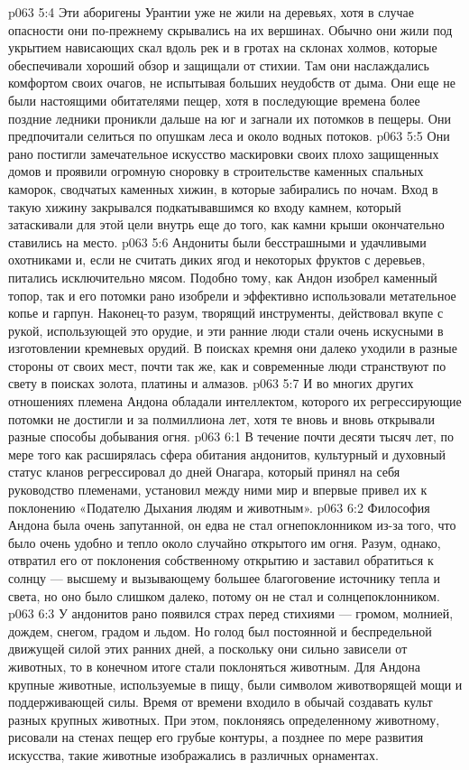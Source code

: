 \vs p063 5:4 Эти аборигены Урантии уже не жили на деревьях, хотя в случае опасности они по\hyp{}прежнему скрывались на их вершинах. Обычно они жили под укрытием нависающих скал вдоль рек и в гротах на склонах холмов, которые обеспечивали хороший обзор и защищали от стихии. Там они наслаждались комфортом своих очагов, не испытывая больших неудобств от дыма. Они еще не были настоящими обитателями пещер, хотя в последующие времена более поздние ледники проникли дальше на юг и загнали их потомков в пещеры. Они предпочитали селиться по опушкам леса и около водных потоков.
\vs p063 5:5 Они рано постигли замечательное искусство маскировки своих плохо защищенных домов и проявили огромную сноровку в строительстве каменных спальных каморок, сводчатых каменных хижин, в которые забирались по ночам. Вход в такую хижину закрывался подкатывавшимся ко входу камнем, который затаскивали для этой цели внутрь еще до того, как камни крыши окончательно ставились на место.
\vs p063 5:6 Андониты были бесстрашными и удачливыми охотниками и, если не считать диких ягод и некоторых фруктов с деревьев, питались исключительно мясом. Подобно тому, как Андон изобрел каменный топор, так и его потомки рано изобрели и эффективно использовали метательное копье и гарпун. Наконец\hyp{}то разум, творящий инструменты, действовал вкупе с рукой, использующей это орудие, и эти ранние люди стали очень искусными в изготовлении кремневых орудий. В поисках кремня они далеко уходили в разные стороны от своих мест, почти так же, как и современные люди странствуют по свету в поисках золота, платины и алмазов.
\vs p063 5:7 И во многих других отношениях племена Андона обладали интеллектом, которого их регрессирующие потомки не достигли и за полмиллиона лет, хотя те вновь и вновь открывали разные способы добывания огня.
\vs p063 6:1 В течение почти десяти тысяч лет, по мере того как расширялась сфера обитания андонитов, культурный и духовный статус кланов регрессировал до дней Онагара, который принял на себя руководство племенами, установил между ними мир и впервые привел их к поклонению «Подателю Дыхания людям и животным».
\vs p063 6:2 \pc Философия Андона была очень запутанной, он едва не стал огнепоклонником из\hyp{}за того, что было очень удобно и тепло около случайно открытого им огня. Разум, однако, отвратил его от поклонения собственному открытию и заставил обратиться к солнцу --- высшему и вызывающему большее благоговение источнику тепла и света, но оно было слишком далеко, потому он не стал и солнцепоклонником.
\vs p063 6:3 У андонитов рано появился страх перед стихиями --- громом, молнией, дождем, снегом, градом и льдом. Но голод был постоянной и беспредельной движущей силой этих ранних дней, а поскольку они сильно зависели от животных, то в конечном итоге стали поклоняться животным. Для Андона крупные животные, используемые в пищу, были символом животворящей мощи и поддерживающей силы. Время от времени входило в обычай создавать культ разных крупных животных. При этом, поклоняясь определенному животному, рисовали на стенах пещер его грубые контуры, а позднее по мере развития искусства, такие животные изображались в различных орнаментах.
